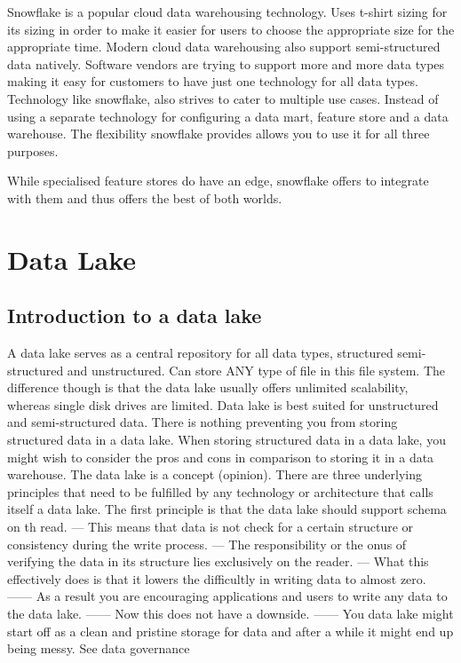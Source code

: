 \documentclass[a4paper, 11pt]{article}
\begin{document}
    Snowflake is a popular cloud data warehousing technology.
    Uses t-shirt sizing for its sizing in order to make it easier for users to choose the appropriate size for the appropriate time.
    Modern cloud data warehousing also support semi-structured data natively.
    Software vendors are trying to support more and more data types making it easy for customers to have just one technology for all data types.
    Technology like snowflake, also strives to cater to multiple use cases.
    Instead of using a separate technology for configuring a data mart, feature store and a data warehouse.
    The flexibility snowflake provides allows you to use it for all three purposes.

    While specialised feature stores do have an edge, snowflake offers to integrate with them and thus offers the best of both worlds.

    \section{Data Lake}

    \subsection{Introduction to a data lake}
    A data lake serves as a central repository for all data types, structured semi-structured and unstructured.
    Can store ANY type of file in this file system.
    The difference though is that the data lake usually offers unlimited scalability, whereas single disk drives are limited.
    Data lake is best suited for unstructured and semi-structured data.
    There is nothing preventing you from storing structured data in a data lake.
    When storing structured data in a data lake, you might wish to consider the pros and cons in comparison to storing it in a data warehouse.
    The data lake is a concept (opinion).
    There are three underlying principles that need to be fulfilled by any technology or architecture that calls itself a data lake.
    The first principle is that the data lake should support schema on th read.
    --- This means that data is not check for a certain structure or consistency during the write process.
    --- The responsibility or the onus of verifying the data in its structure lies exclusively on the reader.
    --- What this effectively does is that it lowers the difficultly in writing data to almost zero.
    ------ As a result you are encouraging applications and users to write any data to the data lake.
    ------ Now this does not have a downside.
    ------ You data lake might start off as a clean and pristine storage for data and after a while it might end up being messy. See data governance
\end{document}
